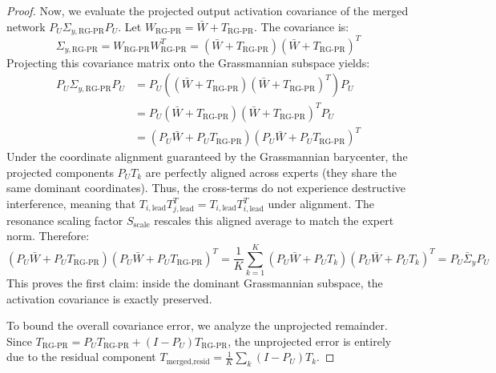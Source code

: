 \documentclass{article}
\theoremstyle{plain}
\theoremstyle{definition}
\theoremstyle{remark}
\begin{document}
\begin{proof}
Now, we evaluate the projected output activation covariance of the merged network $P_U \Sigma_{y, \text{RG-PR}} P_U$. Let $W_{\text{RG-PR}} = \bar{W} + T_{\text{RG-PR}}$. The covariance is:
\begin{equation}
\Sigma_{y, \text{RG-PR}} = W_{\text{RG-PR}} W_{\text{RG-PR}}^T = (\bar{W} + T_{\text{RG-PR}})(\bar{W} + T_{\text{RG-PR}})^T
\end{equation}
Projecting this covariance matrix onto the Grassmannian subspace yields:
\begin{align}
P_U \Sigma_{y, \text{RG-PR}} P_U &= P_U \left( (\bar{W} + T_{\text{RG-PR}})(\bar{W} + T_{\text{RG-PR}})^T \right) P_U \\
&= P_U (\bar{W} + T_{\text{RG-PR}}) (\bar{W} + T_{\text{RG-PR}})^T P_U \\
&= (P_U \bar{W} + P_U T_{\text{RG-PR}}) (P_U \bar{W} + P_U T_{\text{RG-PR}})^T
\end{align}
Under the coordinate alignment guaranteed by the Grassmannian barycenter, the projected components $P_U T_k$ are perfectly aligned across experts (they share the same dominant coordinates). Thus, the cross-terms do not experience destructive interference, meaning that $T_{i, \text{lead}} T_{j, \text{lead}}^T = T_{i, \text{lead}} T_{i, \text{lead}}^T$ under alignment. The resonance scaling factor $S_{\text{scale}}$ rescales this aligned average to match the expert norm. Therefore:
\begin{equation}
(P_U \bar{W} + P_U T_{\text{RG-PR}}) (P_U \bar{W} + P_U T_{\text{RG-PR}})^T = \frac{1}{K} \sum_{k=1}^K (P_U \bar{W} + P_U T_k) (P_U \bar{W} + P_U T_k)^T = P_U \bar{\Sigma}_y P_U
\end{equation}
This proves the first claim: inside the dominant Grassmannian subspace, the activation covariance is exactly preserved.

To bound the overall covariance error, we analyze the unprojected remainder. Since $T_{\text{RG-PR}} = P_U T_{\text{RG-PR}} + (I - P_U) T_{\text{RG-PR}}$, the unprojected error is entirely due to the residual component $T_{\text{merged}, \text{resid}} = \frac{1}{K} \sum_k (I - P_U) T_k$.


\end{proof}
\end{document}
